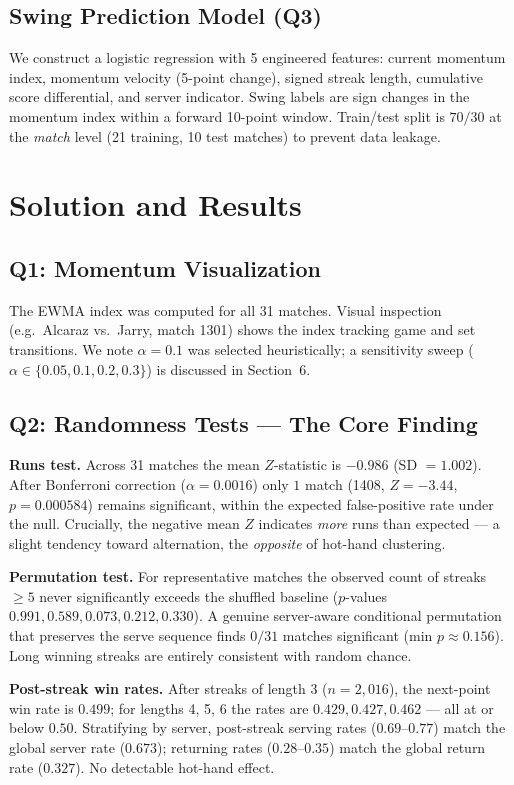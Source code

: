 \documentclass[11pt,a4paper]{article}
\begin{document}
\subsection{Swing Prediction Model (Q3)}
We construct a logistic regression with 5 engineered features: current momentum index, momentum velocity (5-point change), signed streak length, cumulative score differential, and server indicator. Swing labels are sign changes in the momentum index within a forward 10-point window. Train/test split is $70/30$ at the \emph{match} level (21 training, 10 test matches) to prevent data leakage.

\section{Solution and Results}
\subsection{Q1: Momentum Visualization}
The EWMA index was computed for all 31 matches. Visual inspection (e.g.\ Alcaraz vs.\ Jarry, match 1301) shows the index tracking game and set transitions. We note $\alpha = 0.1$ was selected heuristically; a sensitivity sweep ($\alpha \in \{0.05, 0.1, 0.2, 0.3\}$) is discussed in Section~6.

\subsection{Q2: Randomness Tests --- The Core Finding}
\textbf{Runs test.} Across 31 matches the mean $Z$-statistic is $-0.986$ (SD $=1.002$). After Bonferroni correction ($\alpha = 0.0016$) only $1$ match (1408, $Z = -3.44$, $p = 0.000584$) remains significant, within the expected false-positive rate under the null. Crucially, the negative mean $Z$ indicates \emph{more} runs than expected --- a slight tendency toward alternation, the \emph{opposite} of hot-hand clustering.

\textbf{Permutation test.} For representative matches the observed count of streaks $\geq 5$ never significantly exceeds the shuffled baseline ($p$-values $0.991, 0.589, 0.073, 0.212, 0.330$). A genuine server-aware conditional permutation that preserves the serve sequence finds $0/31$ matches significant (min $p \approx 0.156$). Long winning streaks are entirely consistent with random chance.

\textbf{Post-streak win rates.} After streaks of length 3 ($n = 2{,}016$), the next-point win rate is $0.499$; for lengths 4, 5, 6 the rates are $0.429, 0.427, 0.462$ --- all at or below $0.50$. Stratifying by server, post-streak serving rates ($0.69$--$0.77$) match the global server rate ($0.673$); returning rates ($0.28$--$0.35$) match the global return rate ($0.327$). No detectable hot-hand effect.
\end{document}
